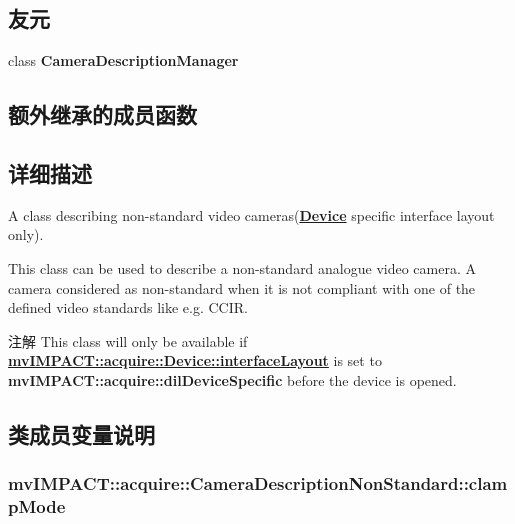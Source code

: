 \subsection*{友元}
\begin{DoxyCompactItemize}
\item 
\hypertarget{classmv_i_m_p_a_c_t_1_1acquire_1_1_camera_description_non_standard_a754f74db1fd8a2e7cf0bca76c10d00dd}{class {\bfseries Camera\+Description\+Manager}}\label{classmv_i_m_p_a_c_t_1_1acquire_1_1_camera_description_non_standard_a754f74db1fd8a2e7cf0bca76c10d00dd}

\end{DoxyCompactItemize}
\subsection*{额外继承的成员函数}


\subsection{详细描述}
A class describing non-\/standard video cameras({\bfseries \hyperlink{classmv_i_m_p_a_c_t_1_1acquire_1_1_device}{Device}} specific interface layout only). 

This class can be used to describe a non-\/standard analogue video camera. A camera considered as non-\/standard when it is not compliant with one of the defined video standards like e.\+g. C\+C\+I\+R.

\begin{DoxyNote}{注解}
This class will only be available if {\bfseries \hyperlink{classmv_i_m_p_a_c_t_1_1acquire_1_1_device_ab4dd0ecc9d456bb5ddc01d844c9d6f2d}{mv\+I\+M\+P\+A\+C\+T\+::acquire\+::\+Device\+::interface\+Layout}} is set to {\bfseries mv\+I\+M\+P\+A\+C\+T\+::acquire\+::dil\+Device\+Specific} before the device is opened. 
\end{DoxyNote}


\subsection{类成员变量说明}
\hypertarget{classmv_i_m_p_a_c_t_1_1acquire_1_1_camera_description_non_standard_ab91de3b95c85d57f81b5bc7eaae108fa}{
\subsubsection[{clamp\+Mode}]{ mv\+I\+M\+P\+A\+C\+T\+::acquire\+::\+Camera\+Description\+Non\+Standard\+::clamp\+Mode}}\label{classmv_i_m_p_a_c_t_1_1acquire_1_1_camera_description_non_standard_ab91de3b95c85d57f81b5bc7eaae108fa}


